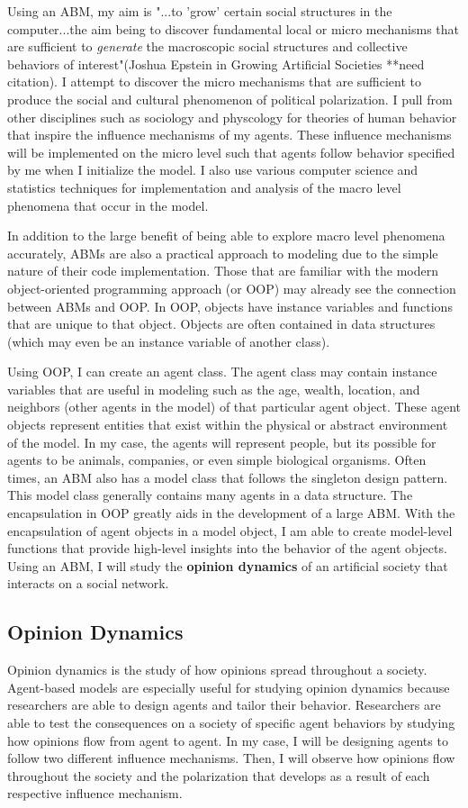 Using an ABM, my aim is "...to 'grow' certain social structures in the computer...the aim being to discover fundamental local or micro mechanisms that are sufficient to \textit{generate} the macroscopic social structures and collective behaviors of interest"(Joshua Epstein in Growing Artificial Societies **need citation). I attempt to discover the micro mechanisms that are sufficient to produce the social and cultural phenomenon of political polarization. I pull from other disciplines such as sociology and physcology for theories of human behavior that inspire the influence mechanisms of my agents. These influence mechanisms will be implemented on the micro level such that agents follow behavior specified by me when I initialize the model. I also use various computer science and statistics techniques for implementation and analysis of the macro level phenomena that occur in the model.    

In addition to the large benefit of being able to explore macro level phenomena accurately, ABMs are also a practical approach to modeling due to the simple nature of their code implementation. Those that are familiar with the modern object-oriented programming approach (or OOP) may already see the connection between ABMs and OOP. In OOP, objects have instance variables and functions that are unique to that object. Objects are often contained in data structures (which may even be an instance variable of another class). 

Using OOP, I can create an agent class. The agent class may contain instance variables that are useful in modeling such as the age, wealth, location, and neighbors (other agents in the model) of that particular agent object. These agent objects represent entities that exist within the physical or abstract environment of the model. In my case, the agents will represent people, but its possible for agents to be animals, companies, or even simple biological organisms. Often times, an ABM also has a model class that follows the singleton design pattern. This model class generally contains many agents in a data structure. The encapsulation in OOP greatly aids in the development of a large ABM. With the encapsulation of agent objects in a model object, I am able to create model-level functions that provide high-level insights into the behavior of the agent objects. Using an ABM, I will study the \textbf{opinion dynamics} of an artificial society that interacts on a social network.


\subsection{Opinion Dynamics}
Opinion dynamics is the study of how opinions spread throughout a society. Agent-based models are especially useful for studying opinion dynamics because researchers are able to design agents and tailor their behavior. Researchers are able to test the consequences on a society of specific agent behaviors by studying how opinions flow from agent to agent. In my case, I will be designing agents to follow two different influence mechanisms. Then, I will observe how opinions flow throughout the society and the polarization that develops as a result of each respective influence mechanism.

